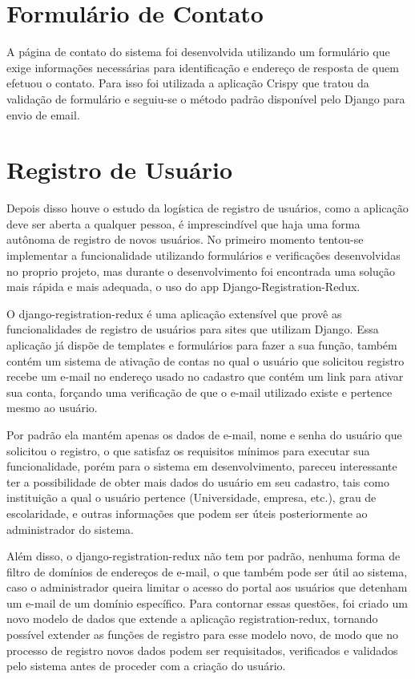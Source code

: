 \documentclass[tg]{mdtufsm}
\begin{document}
\section{Formulário de Contato}
A página de contato do sistema foi desenvolvida utilizando um formulário que exige informações necessárias para identificação e endereço de resposta de quem efetuou o contato. Para isso foi utilizada a aplicação Crispy que tratou da validação de formulário e seguiu-se o método padrão disponível pelo Django para envio de email.

\section{Registro de Usuário}
Depois disso houve o estudo da logística de registro de usuários, como a aplicação deve ser aberta a qualquer pessoa, é imprescindível que haja uma forma autônoma de registro de novos usuários. No primeiro momento tentou-se implementar a funcionalidade utilizando formulários e verificações desenvolvidas no proprio projeto, mas durante o desenvolvimento foi encontrada uma solução mais rápida e mais adequada, o uso do app Django-Registration-Redux.

O django-registration-redux é uma aplicação extensível que provê as funcionalidades de registro de usuários para sites que utilizam Django. Essa aplicação já dispõe de templates e formulários para fazer a sua função, também contém um sistema de ativação de contas no qual o usuário que solicitou registro recebe um e-mail no endereço usado no cadastro que contém um link para ativar sua conta, forçando uma verificação de que o e-mail utilizado existe e pertence mesmo ao usuário.

 Por padrão ela mantém apenas os dados de e-mail, nome e senha do usuário que solicitou o registro, o que satisfaz os requisitos mínimos para executar sua funcionalidade, porém para o sistema em desenvolvimento, pareceu interessante ter a possibilidade de obter mais dados do usuário em seu cadastro, tais como instituição a qual o usuário pertence (Universidade, empresa, etc.), grau de escolaridade, e outras informações que podem ser úteis posteriormente ao administrador do sistema.

Além disso, o django-registration-redux não tem por padrão, nenhuma forma de filtro de domínios de endereços de e-mail, o que também pode ser útil ao sistema, caso o administrador queira limitar o acesso do portal aos usuários que detenham um e-mail de um domínio específico.
Para contornar essas questões, foi criado um novo modelo de dados que extende a aplicação registration-redux, tornando possível extender as funções de registro para esse modelo novo, de modo que no processo de registro novos dados podem ser requisitados, verificados e validados pelo sistema antes de proceder com a criação do usuário.
\end{document}
